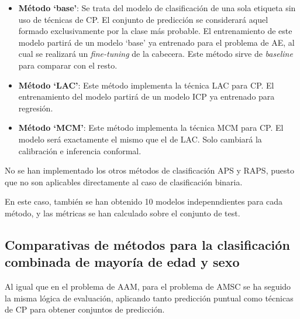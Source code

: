 \begin{itemize}

\item \textbf{Método `base'}: Se trata del modelo de clasificación de una sola etiqueta sin uso de técnicas de CP. El conjunto de predicción se considerará aquel formado exclusivamente por la clase más probable. El entrenamiento de este modelo partirá de un modelo `base' ya entrenado para el problema de AE, al cual se realizará un \textit{fine-tuning} de la cabecera. Este método sirve de \textit{baseline} para comparar con el resto. 

\item \textbf{Método `LAC'}: Este método implementa la técnica LAC para CP. El entrenamiento del modelo partirá de un modelo ICP ya entrenado para regresión.

\item \textbf{Método `MCM'}: Este método implementa la técnica MCM para CP. El modelo será exactamente el mismo que el de LAC. Solo cambiará la calibración e inferencia conformal. 

\end{itemize} 

No se han implementado los otros métodos de clasificación APS y RAPS, puesto que no son aplicables directamente al caso de clasificación binaria.

En este caso, también se han obtenido 10 modelos indepenndientes para cada método, y las métricas se han calculado sobre el conjunto de test. 


\subsection{Comparativas de métodos para la clasificación combinada de mayoría de edad y sexo}

Al igual que en el problema de AAM, para el problema de AMSC se ha seguido la misma lógica de evaluación, aplicando tanto predicción puntual como técnicas de CP para obtener conjuntos de predicción. 


